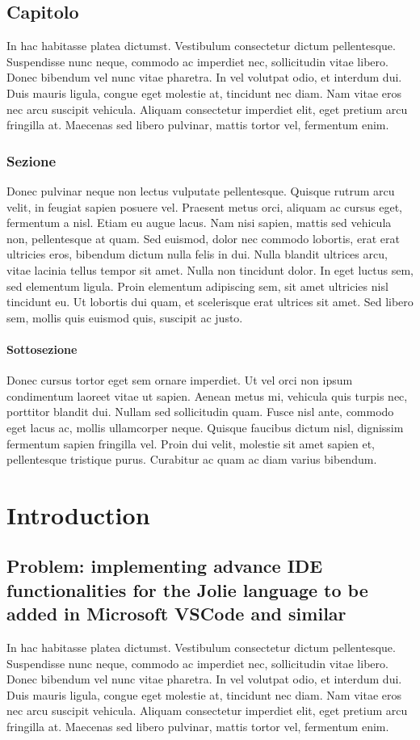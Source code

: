 \documentclass[target=bach]{thud}[2019/10/17]
\begin{document}
\chapter{Capitolo}
In hac habitasse platea dictumst. Vestibulum consectetur dictum pellentesque. Suspendisse nunc neque, commodo ac imperdiet nec, sollicitudin vitae libero. Donec bibendum vel nunc vitae pharetra. In vel volutpat odio, et interdum dui. Duis mauris ligula, congue eget molestie at, tincidunt nec diam. Nam vitae eros nec arcu suscipit vehicula. Aliquam consectetur imperdiet elit, eget pretium arcu fringilla at. Maecenas \cite{Knu86} sed libero pulvinar, mattis tortor vel, fermentum enim.

\section{Sezione}
Donec pulvinar neque non lectus vulputate pellentesque. Quisque rutrum arcu velit, in feugiat sapien posuere vel. Praesent metus orci, aliquam ac cursus eget, fermentum a nisl. Etiam eu augue lacus. Nam nisi sapien, mattis sed vehicula non, pellentesque at quam. Sed euismod, dolor nec commodo lobortis, erat erat ultricies eros, bibendum dictum nulla felis in dui. Nulla blandit ultrices arcu, vitae lacinia tellus tempor sit amet. Nulla non tincidunt dolor. In eget luctus sem, sed elementum ligula. Proin elementum adipiscing sem, sit amet ultricies nisl tincidunt eu. Ut lobortis dui quam, et scelerisque erat ultrices sit amet. Sed libero sem, mollis quis euismod quis, suscipit ac justo.

\subsection{Sottosezione}
Donec cursus tortor eget sem ornare imperdiet. Ut vel orci non ipsum condimentum laoreet vitae ut sapien. Aenean metus mi, vehicula quis turpis nec, porttitor blandit dui. Nullam sed sollicitudin quam. Fusce nisl ante, commodo eget lacus ac, mollis ullamcorper neque. Quisque faucibus dictum nisl, dignissim fermentum sapien fringilla vel. Proin dui velit, molestie sit amet sapien et, pellentesque tristique purus. Curabitur ac quam ac diam varius bibendum.\part{Introduction}

\chapter{Problem: implementing advance IDE functionalities for the Jolie language to be added in Microsoft VSCode and similar}
In hac habitasse platea dictumst. Vestibulum consectetur dictum pellentesque. Suspendisse nunc neque, commodo ac imperdiet nec, sollicitudin vitae libero. Donec bibendum vel nunc vitae pharetra. In vel volutpat odio, et interdum dui. Duis mauris ligula, congue eget molestie at, tincidunt nec diam. Nam vitae eros nec arcu suscipit vehicula. Aliquam consectetur imperdiet elit, eget pretium arcu fringilla at. Maecenas \cite{Knu86} sed libero pulvinar, mattis tortor vel, fermentum enim.
\end{document}
